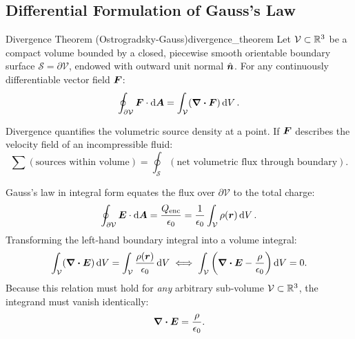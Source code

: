 \subsection{Differential Formulation of Gauss's Law}

\begin{theorem}{Divergence Theorem (Ostrogradsky-Gauss)}{divergence_theorem}
Let $\mathcal{V} \subset \mathbb{R}^3$ be a compact volume bounded by a closed, piecewise smooth orientable boundary surface $\mathcal{S} = \partial\mathcal{V}$, endowed with outward unit normal $\hat{\vb*{n}}$. For any continuously differentiable vector field $\vb*{F}$:
\begin{equation}
    \oint_{\partial\mathcal{V}} \vb*{F} \cdot \dd{\vb*{A}} = \int_{\mathcal{V}} (\div{\vb*{F}}) \dd{V}.
\end{equation}
\end{theorem}

\begin{remark}
Divergence quantifies the volumetric source density at a point. If $\vb*{F}$ describes the velocity field of an incompressible fluid:
\begin{equation}
    \sum (\text{sources within volume}) = \oint_{\mathcal{S}} (\text{net volumetric flux through boundary}).
\end{equation}
\end{remark}

\begin{proofbox}
Gauss's law in integral form equates the flux over $\partial\mathcal{V}$ to the total charge:
\begin{equation}
    \oint_{\partial\mathcal{V}} \vb*{E} \cdot \dd{\vb*{A}} = \frac{Q_{\text{enc}}}{\epsilon_0} = \frac{1}{\epsilon_0}\int_{\mathcal{V}} \rho(\vb*{r}) \dd{V}.
\end{equation}
Transforming the left-hand boundary integral into a volume integral:
\begin{equation}
    \int_{\mathcal{V}} (\div{\vb*{E}}) \dd{V} = \int_{\mathcal{V}} \frac{\rho(\vb*{r})}{\epsilon_0} \dd{V} \iff \int_{\mathcal{V}} \left( \div{\vb*{E}} - \frac{\rho}{\epsilon_0} \right) \dd{V} = 0.
\end{equation}
Because this relation must hold for \emph{any} arbitrary sub-volume $\mathcal{V} \subset \mathbb{R}^3$, the integrand must vanish identically:
\begin{equation}
    \div{\vb*{E}} = \frac{\rho}{\epsilon_0}.
\end{equation}
\end{proofbox}

